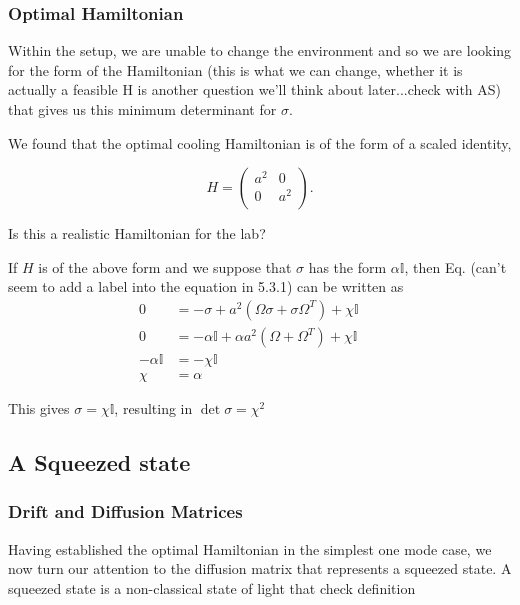 \documentclass[11pt,a4paper]{article}
\numberwithin{equation}{section}
\begin{document}
	
	\subsubsection{Optimal Hamiltonian}
	Within the setup, we are unable to change the environment and so we are looking for the form of the Hamiltonian \color{blue}(this is what we can change, whether it is actually a feasible H is another question we'll think about later...check with AS) \color{black} that gives us this minimum determinant for $\sigma$.
	
	We found that the optimal cooling Hamiltonian is of the form of a scaled identity,
	
	\begin{equation*}
	H =  \begin{pmatrix}
	a^2 & 0  \\
	0 & a^2\\
	\end{pmatrix}.
	\end{equation*}

	\color{blue}Is this a realistic Hamiltonian for the lab?\color{black}
	
	If $H$ is of the above form and we suppose that $\sigma$ has the form $\alpha \mathbb{I}$, then Eq. (can't seem to add a label into the equation in 5.3.1) can be written as
	\begin{align*}
	0 &= -\sigma + a^2 (\Omega \sigma + \sigma \Omega^{T}) + \chi \mathbb{I}&\\
	0 &= -\alpha \mathbb{I} + \alpha a^2 (\Omega + \Omega^T) + \chi \mathbb{I}&\\
	-\alpha \mathbb{I} & = -\chi \mathbb{I} & \tag*{as $\Omega$ is anti-symmetric}&\\
	\chi &= \alpha&
	\end{align*}
	
	This gives $\sigma = \chi \mathbb{I}$, resulting in $\det \sigma = \chi^2$ 

	\iffalse
	\subsection{A Squeezed state}
	\subsubsection{Drift and Diffusion Matrices}
	Having established the optimal Hamiltonian in the simplest one mode case, we now turn our attention to the diffusion matrix that represents a squeezed state. A squeezed state is a non-classical state of light that \color{blue} check definition \color{black}
	
\end{document}
